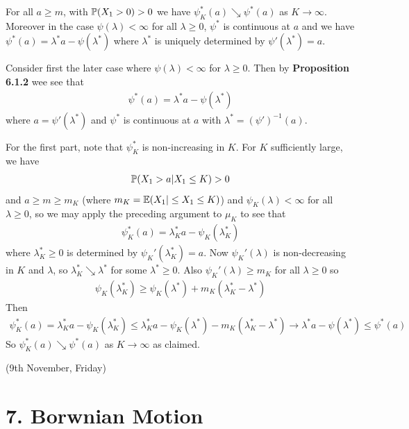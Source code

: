\documentclass[12pt,a4paper]{report}
\newenvironment{proof}
{\begin{changemargin}{1cm}{0.5cm} 
	}%
	{\end{changemargin}
}
\begin{document}
 For all $a\geq m$, with $\mathbb{P}(X_1 > 0) > 0$ we have $\psi^*_K(a) \searrow \psi^*(a)$ as $K\rightarrow \infty$. Moreover in the case $\psi(\lambda) < \infty$ for all $\lambda \geq 0$, $\psi^*$ is continuous at $a$ and we have $\psi^*(a) =\lambda^* a - \psi(\lambda^*)$ where $\lambda^*$ is uniquely determined by $\psi'(\lambda^*) = a$.
\begin{proof}
\pf Consider first the later case where $\psi(\lambda) < \infty$ for $\lambda \geq 0$. Then by \textbf{Proposition 6.1.2} wee see that
\begin{align*}
\psi^*(a) = \lambda^* a -\psi(\lambda^*)
\end{align*}
where $a= \psi' (\lambda^*)$ and $\psi^*$ is continuous at $a$ with $\lambda^* = (\psi')^{-1}(a)$.
\s

\quad For the first part, note that $\psi_K^*$ is non-increasing in $K$. For $K$ sufficiently large, we have
\begin{align*}
\mathbb{P}(X_1>a | X_1 \leq K) >0
\end{align*}
and $a\geq m \geq m_K$ (where $m_K = \mathbb{E}(X_1 |\leq X_1 \leq K)$) and $\psi_K(\lambda) < \infty$ for all $\lambda \geq 0$, so we may apply the preceding argument to $\mu_K$ to see that
\begin{align*}
\psi^*_K(a) = \lambda_K^* a - \psi_K(\lambda_K^*)
\end{align*}
where $\lambda_K^* \geq 0$ is determined by $\psi_K'(\lambda_K^*) = a$. Now $\psi_K'(\lambda)$ is non-decreasing in $K$ and $\lambda$, so $\lambda_K^* \searrow \lambda^*$ for some $\lambda^* \geq 0$. Also $\psi_K'(\lambda) \geq m_K$ for all $\lambda \geq 0$ so
\begin{align*}
\psi_K(\lambda_K^*) \geq \psi_K(\lambda^*) + m_K(\lambda_K^* - \lambda^*)
\end{align*}
Then
\begin{align*}
\psi^*_K(a) = \lambda_K^* a - \psi_K(\lambda^*_K) \leq \lambda^*_K a - \psi_K(\lambda^*) - m_K(\lambda^*_K - \lambda^*) \rightarrow \lambda^* a - \psi(\lambda^*) \leq \psi^*(a)
\end{align*}
So $\psi_K^*(a) \searrow \psi^*(a)$ as $K\rightarrow \infty$ as claimed.

\eop
\end{proof}
\s

\newday

(9th November, Friday)
\s

\section*{7. Borwnian Motion}
\end{document}
